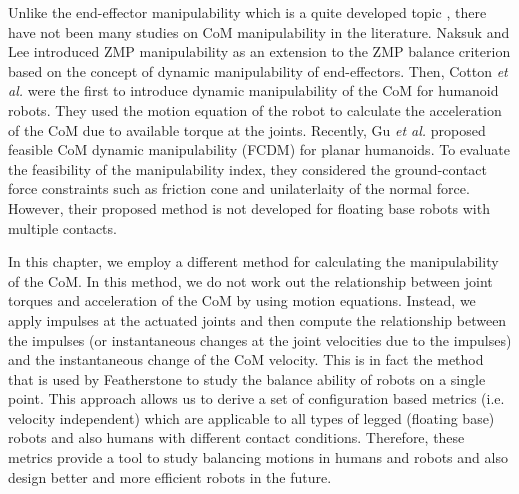 Unlike the end-effector manipulability which is a quite developed topic
\cite{Bowling&Khatib05, Dotyetal95, Guilamoetal06, Prattichizzoetal12,
  Yoshikawa85}, there have not been many studies on CoM manipulability in the
literature.  Naksuk and Lee \cite{Naksuk&Lee06} introduced ZMP manipulability
as an extension to the ZMP balance criterion based on the concept of dynamic
manipulability of end-effectors.  Then, Cotton \emph{et al.}
\cite{Cottonetal10} were the first to introduce dynamic manipulability of the
CoM for humanoid robots.  They used the motion equation of the robot to
calculate the acceleration of the CoM due to available torque at the joints.
Recently, Gu \emph{et al.} \cite{Guetal15} proposed feasible CoM dynamic
manipulability (FCDM) for planar humanoids.  To evaluate the feasibility of
the manipulability index, they considered the ground-contact force constraints
such as friction cone and unilaterlaity of the normal force.  However, their
proposed method is not developed for floating base robots with multiple
contacts.

In this chapter, we employ a different method for calculating the
manipulability of the CoM.  In this method, we do not work out the
relationship between joint torques and acceleration of the CoM by using motion
equations.  Instead, we apply impulses at the actuated joints and then compute
the relationship between the impulses (or instantaneous changes at the joint
velocities due to the impulses) and the instantaneous change of the CoM
velocity.  This is in fact the method that is used by Featherstone
\cite{Featherstone13,Featherstone15} to study the balance ability of robots on
a single point.  This approach allows us to derive a set of configuration
based metrics (i.e. velocity independent) which are applicable to all types of
legged (floating base) robots and also humans with different contact
conditions.  Therefore, these metrics provide a tool to study balancing
motions in humans and robots and also design better and more efficient robots
in the future.

